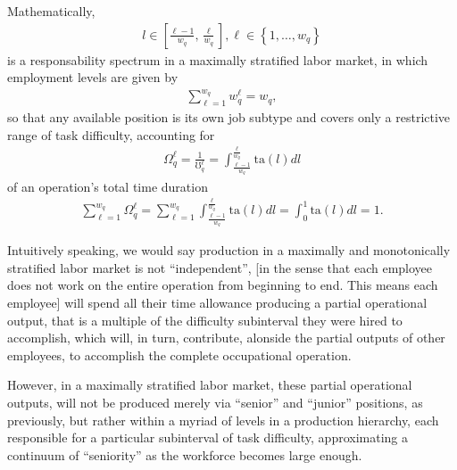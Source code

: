 \documentclass[hidelinks, nonatbib]{elsarticle}
\begin{document}
\begin{enumerate}
\begin{enumerate}
\begin{enumerate}
            Mathematically,
            \begin{gather}
                l \in \left[
                \frac{\ell - 1}{w_q}
                ,
                \frac{\ell}{w_q}
                \right]
                ,
                \ell \in 
                \left\{
                    1, \dots, w_q
                \right\}
            \end{gather}
            is a responsability spectrum in a maximally stratified labor market, in which employment levels are given by
            \begin{gather}
                \sum_{\ell=1}^{w_q}
                w_{q}^{\ell}
                =
                w_q
                ,
            \end{gather}
            so that any available position is its own job subtype and covers only a restrictive range of task difficulty, accounting for
            \begin{gather}
                \Omega_{q}^{\ell} = 
                \frac{1}{\mho_{q}^{\ell}} = 
                \int_{
                    \frac{\ell - 1}{w_q}
                }^{
                    \frac{\ell}{w_q}
                }
                \text{ta}(l)dl
            \end{gather}
            of an operation's total time duration
            \begin{gather}
                \sum_{\ell=1}^{w_q}
                \Omega_{q}^{\ell} 
                = 
                \sum_{\ell=1}^{w_q}
                \int_{
                    \frac{\ell - 1}{w_q}
                }^{
                    \frac{\ell}{w_q}
                }
                \text{ta}(l)dl
                =
                \int_{0}^{1}
                \text{ta}(l)dl
                =
                1
                .
            \end{gather}

            Intuitively speaking, we would say production in a maximally and monotonically stratified labor market is not ``independent'', [in the sense that each employee does not work on the entire operation from beginning to end. This means each employee] will spend all their time allowance producing a partial operational output, that is a multiple of the difficulty subinterval they were hired to accomplish, which will, in turn, contribute, alonside the partial outputs of other employees, to accomplish the complete occupational operation.
            
            However, in a maximally stratified labor market, these partial operational outputs, will not be produced merely via ``senior'' and ``junior'' positions, as previously, but rather within a myriad of levels in a production hierarchy, each responsible for a particular subinterval of task difficulty, approximating a continuum of ``seniority'' as the workforce becomes large enough.
            

\end{enumerate}
\end{enumerate}
\end{enumerate}
\end{document}
